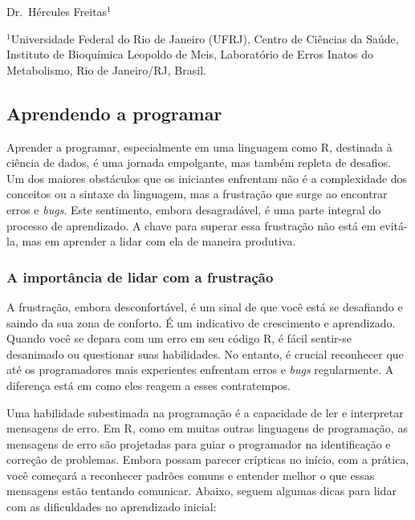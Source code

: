 \documentclass[
]{book}
\begin{document}
Dr.~Hércules Freitas\(^1\)

\(^1\)Universidade Federal do Rio de Janeiro (UFRJ), Centro de Ciências da Saúde, Instituto de Bioquímica Leopoldo de Meis, Laboratório de Erros Inatos do Metabolismo, Rio de Janeiro/RJ, Brasil.

\subsection{Aprendendo a programar}\label{aprendendo-a-programar}

Aprender a programar, especialmente em uma linguagem como R, destinada à ciência de dados, é uma jornada empolgante, mas também repleta de desafios. Um dos maiores obstáculos que os iniciantes enfrentam não é a complexidade dos conceitos ou a sintaxe da linguagem, mas a frustração que surge ao encontrar erros e \emph{bugs}. Este sentimento, embora desagradável, é uma parte integral do processo de aprendizado. A chave para superar essa frustração não está em evitá-la, mas em aprender a lidar com ela de maneira produtiva.

\subsubsection{A importância de lidar com a frustração}\label{a-importuxe2ncia-de-lidar-com-a-frustrauxe7uxe3o}

A frustração, embora desconfortável, é um sinal de que você está se desafiando e saindo da sua zona de conforto. É um indicativo de crescimento e aprendizado. Quando você se depara com um erro em seu código R, é fácil sentir-se desanimado ou questionar suas habilidades. No entanto, é crucial reconhecer que até os programadores mais experientes enfrentam erros e \emph{bugs} regularmente. A diferença está em como eles reagem a esses contratempos.

Uma habilidade subestimada na programação é a capacidade de ler e interpretar mensagens de erro. Em R, como em muitas outras linguagens de programação, as mensagens de erro são projetadas para guiar o programador na identificação e correção de problemas. Embora possam parecer crípticas no início, com a prática, você começará a reconhecer padrões comuns e entender melhor o que essas mensagens estão tentando comunicar. Abaixo, seguem algumas dicas para lidar com as dificuldades no aprendizado inicial:
\end{document}
